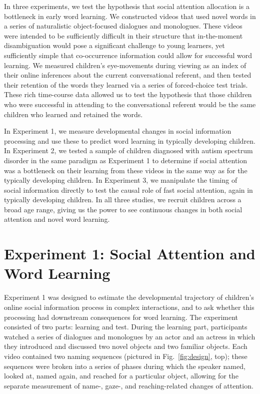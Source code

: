 \documentclass{pnastwo}
\begin{document}
\begin{article}
In three experiments, we test the hypothesis that social attention allocation is a bottleneck in early word learning. We constructed videos that used novel words in a series of naturalistic object-focused dialogues and monologues. These videos were intended to be sufficiently difficult in their structure that in-the-moment disambiguation would pose a significant challenge to young learners, yet sufficiently simple that co-occurrence information could allow for successful word learning. We measured children's eye-movements during viewing as an index of their online inferences about the current conversational referent, and then tested their retention of the words they learned via a series of forced-choice test trials. These rich time-course data allowed us to test the hypothesis that those children who were successful in attending to the conversational referent would be the same children who learned and retained the words. 

In Experiment 1, we measure developmental changes in social information processing and use these to predict word learning in typically developing children. In Experiment 2, we tested a sample of children diagnosed with autism spectrum disorder in the same paradigm as Experiment 1 to determine if social attention was a bottleneck on their learning from these videos in the same way as for the typically developing children. In Experiment 3, we manipulate the timing of social information directly to test the causal role of fast social attention, again in typically developing children. In all three studies, we recruit children across a broad age range, giving us the power to see continuous changes in both social attention and novel word learning. 

\section{Experiment 1: Social Attention and Word Learning}

Experiment 1 was designed to estimate the developmental trajectory of children's online social information process in complex interactions, and to ask whether this processing had downstream consequences for word learning. The experiment consisted of two parts: learning and test. During the learning part, participants watched a series of dialogues and monologues by an actor and an actress in which they introduced and discussed two novel objects and two familiar objects. Each video contained two naming sequences (pictured in Fig.~\ref{fig:design}, top); these sequences were broken into a series of phases during which the speaker named, looked at, named again, and reached for a particular object, allowing for the separate measurement of name-, gaze-, and reaching-related changes of attention. 


\end{article}
\end{document}
